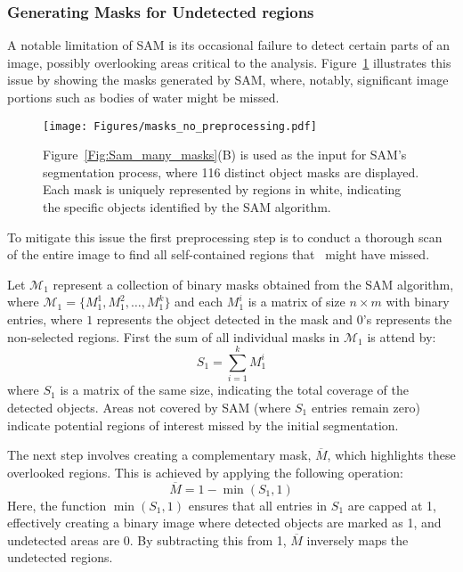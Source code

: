 \subsubsection{Generating Masks for Undetected regions}

A notable limitation of SAM is its occasional failure to detect certain parts of an image, possibly overlooking areas critical to the analysis. Figure~\ref{Fig:maks_no_preprocessing} illustrates this issue by showing the masks generated by SAM, where, notably, significant image portions such as bodies of water might be missed.

\begin{figure}[ht!]
\begin{center}
\texttt{[image: Figures/masks\_no\_preprocessing.pdf]}
\end{center}
\caption{Figure~\ref{Fig:Sam_many_masks}(B) is used as the input for SAM's segmentation process, where 116 distinct object masks are displayed. Each mask is uniquely represented by regions in white, indicating the specific objects identified by the SAM algorithm. }
\label{Fig:maks_no_preprocessing}
\end{figure} 

To mitigate this issue the first preprocessing step is to conduct a thorough scan of the entire image to find all self-contained regions that \SAM\ might have missed. 

Let $\mathcal{M}_1$ represent a collection of binary masks obtained from the SAM algorithm, where $\mathcal{M}_1 = \{M_1^1, M_1^2, \ldots, M_1^k\} $ and each $M_1^i$ is a matrix of size $n \times m$ with binary entries, where $1$ represents the object detected in the mask and $0$'s represents the non-selected regions. First the sum of all individual masks in $\mathcal{M}_1$ is attend by:
\begin{equation*}
S_1 = \sum_{i=1}^{k} M_1^i 
\end{equation*}
where \( S_1 \) is a matrix of the same size, indicating the total coverage of the detected objects. Areas not covered by SAM (where \( S_1 \) entries remain zero) indicate potential regions of interest missed by the initial segmentation.

The next step involves creating a complementary mask, \( \overline{M} \), which highlights these overlooked regions. This is achieved by applying the following operation:
\begin{equation*}
\overline{M} = 1 - \min(S_1, 1) 
\end{equation*}
Here, the function \( \min(S_1, 1) \) ensures that all entries in \( S_1 \) are capped at 1, effectively creating a binary image where detected objects are marked as 1, and undetected areas are 0. By subtracting this from 1, \( \overline{M} \) inversely maps the undetected regions.

